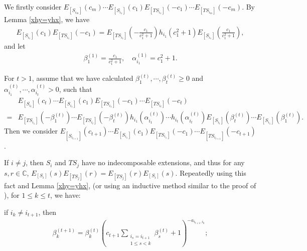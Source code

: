 \documentclass[12pt]{amsart}
\begin{document}
We firstly consider $E_{[S_{i_m}]}(c_m) \cdots E_{[S_{i_1}]}(c_1)E_{[TS_{i_1}]}(-c_1)\cdots E_{[TS_{i_m}]}(-c_m)$.
By Lemma \ref{xhy=yhx}, we have 
\begin{align*}
    E_{[S_{i_1}]}(c_1)E_{[TS_{i_1}]}(-c_1)=E_{[TS_{i_1}]}(-\frac{c_1}{c_1^2+1})h_{i_1}(c_1^2+1)E_{[S_{i_1}]}(\frac{c_1}{c_1^2+1}),
\end{align*}
and let 
\begin{align*}
    \beta_1^{(1)}=\frac{c_1}{c_1^2+1},\quad \alpha_{i_1}^{(1)}=c_1^2+1.
\end{align*}

For $t>1$, assume that we have calculated $\beta_1^{(t)},\cdots,\beta_t^{(t)}\geq 0$ and $\alpha_{i_1}^{(t)},\cdots,\alpha_{i_t}^{(t)}>0$, such that 
\begin{align*}
    &E_{[S_{i_t}]}(c_t) \cdots E_{[S_{i_1}]}(c_1)E_{[TS_{i_1}]}(-c_1)\cdots E_{[TS_{i_t}]}(-c_t)\\
    =&E_{[TS_{i_1}]}(-\beta_1^{(t)})\cdots E_{[TS_{i_t}]}(-\beta_t^{(t)})h_{i_1}(\alpha_{i_1}^{(t)})\cdots h_{i_t}(\alpha_{i_t}^{(t)}) E_{[S_{i_t}]}(\beta_t^{(t)})\cdots E_{[S_{i_1}]}(\beta_1^{(t)}).
\end{align*}
Then we consider $E_{[S_{i_{t+1}}]}(c_{t+1}) \cdots E_{[S_{i_1}]}(c_1)E_{[TS_{i_1}]}(-c_1)\cdots E_{[TS_{i_{t+1}}]}(-c_{t+1})$.

If $i\neq j$, then $S_i$ and $TS_j$ have no indecomposable extensions, and thus for any $s,r\in \mathbb{C}$, $E_{[S_i]}(s)E_{[TS_j]}(r)=E_{[TS_j]}(r)E_{[S_i]}(s)$.
Repeatedly using this fact and Lemma \ref{xhy=yhx}, (or using an inductive method similar to the proof of \cite[Proposition 3.2]{TC}), for $1\leq k\leq t$, we have:

 if $i_k\neq i_{t+1}$, then 
\begin{align}\label{inductive1}
    \beta_k^{(t+1)}=\beta_k^{(t)}(c_{t+1}\sum_{\substack{i_s=i_{t+1}\\1\leq s<k}} \beta_s^{(t)}+1)^{-a_{i_{t+1},i_k}};
\end{align}
\end{document}
